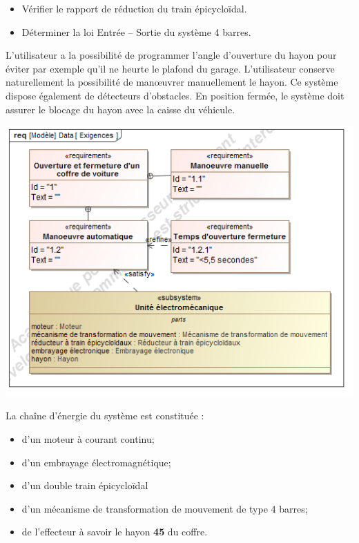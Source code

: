 \documentclass[10pt,fleqn]{article} %
\begin{document}
\begin{multicols}{2}
\begin{multicols}{2}
\begin{obj}
\begin{itemize}
\item Vérifier le rapport de réduction du train épicycloïdal.
\item Déterminer la loi Entrée -- Sortie du système 4 barres.
\end{itemize}
\end{obj}

L’utilisateur a la possibilité de programmer l’angle d’ouverture du hayon pour
éviter par exemple qu’il ne heurte le plafond du garage. L’utilisateur conserve
naturellement la possibilité de man\oe{}uvrer manuellement le hayon. Ce système
dispose également de détecteurs d’obstacles.
En position fermée, le système doit assurer le blocage du hayon avec la caisse
du véhicule.
\begin{center}
\includegraphics[width=.95\linewidth]{images/SysML/Req}
\end{center}



La chaîne d'énergie du système est constituée :
\begin{itemize}
\item d'un moteur à courant continu;
\item d'un embrayage électromagnétique;
\item d'un double train épicycloïdal
\item d'un mécanisme de transformation de mouvement de type 4 barres;
\item de l'effecteur à savoir le hayon \textbf{45} du coffre.
\end{itemize}


\end{multicols}
\end{multicols}
\end{document}
